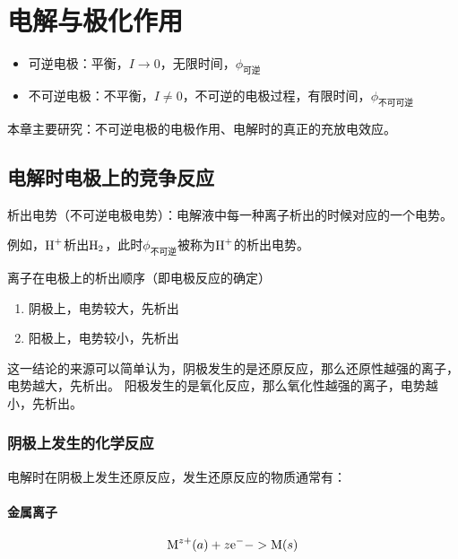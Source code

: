 \chapter{电解与极化作用}
% 
\begin{itemize}
    \item 可逆电极：平衡，$I \to 0$，无限时间，$\phi_{\mbox{可逆}}$
    \item 不可逆电极：不平衡，$I \neq 0$，不可逆的电极过程，有限时间，$\phi_{\mbox{不可可逆}}$
\end{itemize}


本章主要研究：不可逆电极的电极作用、电解时的真正的充放电效应。





\section{电解时电极上的竞争反应}


析出电势（不可逆电极电势）：电解液中每一种离子析出的时候对应的一个电势。

例如，$\ce{H+}$析出$\ce{H2}$，此时$\phi_{\mbox{不可逆}}$被称为$\ce{H+}$的析出电势。

离子在电极上的析出顺序（即电极反应的确定）

\begin{enumerate}
    \item 阴极上，电势较大，先析出
    \item 阳极上，电势较小，先析出
\end{enumerate}

这一结论的来源可以简单认为，阴极发生的是还原反应，那么还原性越强的离子，电势越大，先析出。
阳极发生的是氧化反应，那么氧化性越强的离子，电势越小，先析出。

\subsection{阴极上发生的化学反应}

电解时在阴极上发生还原反应，发生还原反应的物质通常有：


\subsubsection{金属离子}

\begin{equation*}
    \ce{M^z+}(a)+ z\ce{e-} -> \ce{M}(s)
\end{equation*}


